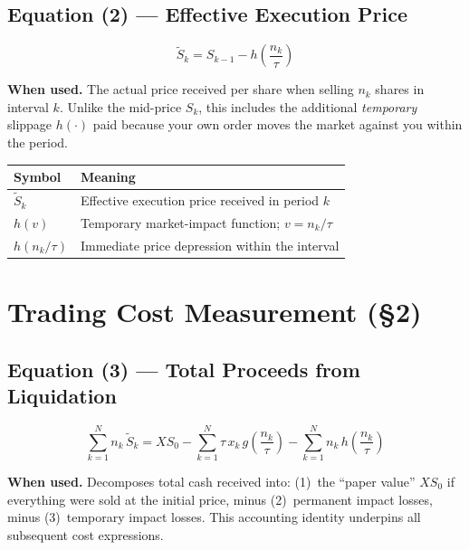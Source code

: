 \documentclass[11pt,a4paper]{article}
\begin{document}
\subsection*{Equation (2) — Effective Execution Price}

\begin{equation}
  \tilde{S}_k = S_{k-1} - h\!\left(\frac{n_k}{\tau}\right)
\end{equation}

\textbf{When used.} The actual price received per share when selling $n_k$ shares in
interval $k$.  Unlike the mid-price $S_k$, this includes the additional \emph{temporary}
slippage $h(\cdot)$ paid because your own order moves the market against you within the
period.

\begin{center}
\begin{tabular}{@{}L{3.5cm}L{10cm}@{}}
\toprule
\textbf{Symbol} & \textbf{Meaning} \\
\midrule
$\tilde{S}_k$ & Effective execution price received in period $k$ \\
$h(v)$ & Temporary market-impact function; $v = n_k/\tau$ \\
$h(n_k/\tau)$ & Immediate price depression within the interval \\
\bottomrule
\end{tabular}
\end{center}

\section{Trading Cost Measurement (\texorpdfstring{\S}{§}2)}

\subsection*{Equation (3) — Total Proceeds from Liquidation}

\begin{equation}
  \sum_{k=1}^{N} n_k\,\tilde{S}_k
  = X S_0
  - \sum_{k=1}^{N} \tau\,x_k\,g\!\left(\frac{n_k}{\tau}\right)
  - \sum_{k=1}^{N} n_k\,h\!\left(\frac{n_k}{\tau}\right)
\end{equation}

\textbf{When used.} Decomposes total cash received into: (1)~the ``paper value'' $XS_0$
if everything were sold at the initial price, minus (2)~permanent impact losses, minus
(3)~temporary impact losses.  This accounting identity underpins all subsequent cost
expressions.
\end{document}
